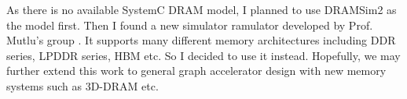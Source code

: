 \documentclass[12pt]{article} %
\begin{document}
As there is no available SystemC DRAM model, I planned to use DRAMSim2 as the model first. Then I found a 
new simulator ramulator developed by Prof. Mutlu's group \cite{kim2016ramulator}. It supports many different memory architectures 
including DDR series, LPDDR series, HBM etc. So I decided to use it instead. Hopefully, we may further extend this work to general graph accelerator design with new memory systems such as 3D-DRAM etc.   



\end{document}

